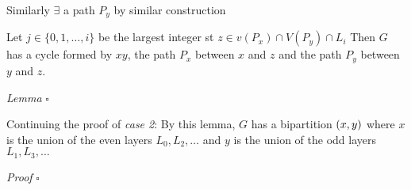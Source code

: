 \documentclass{article}
\begin{document}
\begin{itemize}
    Similarly $\exists$ a path $P_y$ by similar construction

    Let $j \in \{0,1,\dots,i\}$ be the largest integer st $z \in v(P_x) \cap V(P_y)\cap L_i$
    Then $G$ has a cycle formed by $xy$, the path $P_x$ between $x$ and $z$ and the path $P_y$ between $y$ and $z$.

    \textit{Lemma} $\square$

    Continuing the proof of \emph{case 2}:
    By this lemma, $G$ has a bipartition $(x,\space y)$ where $x$ is the union of the even layers $L_0, L_2, \dots$ and $y$ is the union of the odd layers $L_1, L_3, \dots$
\end{itemize}
\textit{Proof} $\square$
\end{document}
